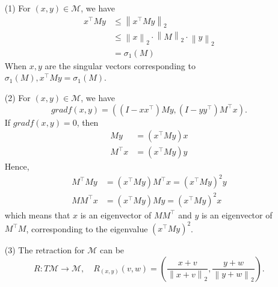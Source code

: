 \documentclass[en, oneside]{assignment}
\begin{document}
\begin{sol}
    \begin{itemize}
        \item[(1)] For $(x, y) \in \mathcal{M}$, we have
        \begin{align*}
            x ^\top M y & \leq \left\lVert x ^\top M y \right\rVert _2\\
            & \leq \left\lVert x \right\rVert _2 \cdot \left\lVert M \right\rVert _2 \cdot \left\lVert y \right\rVert _2\\
            & = \sigma _1 (M)
        \end{align*}
        When $x, y$ are the singular vectors corresponding to $\sigma _1 (M), x ^\top M y = \sigma _1 (M)$.
        \item[(2)] For $(x, y) \in \mathcal{M}$, we have
        \begin{equation*}
            gradf(x, y) = ((I - xx^{\top})M y, (I - yy^{\top})M^{\top} x).
        \end{equation*}
        If $gradf(x, y) = 0$, then
        \begin{align*}
            M y & = (x ^\top M y) x\\
            M ^\top x & = (x ^\top M y) y
        \end{align*}
        Hence, 
        \begin{align*}
            M ^\top M y & = (x ^\top M y) M^\top x = (x ^\top M y) ^2 y\\
            M M ^\top x & = (x ^\top M y) M y = (x ^\top M y) ^2 x
        \end{align*}
        which means that $x$ is an eigenvector of $M M^\top$ and $y$ is an eigenvector of $M ^\top M$, corresponding to the eigenvalue $(x ^\top M y) ^2$.
        \item[(3)] The retraction for $\mathcal{M}$ can be
        \begin{equation*}
            R: T \mathcal{M} \to \mathcal{M}, \quad R _{(x, y)} (v, w) = 
            (\frac{x+v}{\left\lVert x+v \right\rVert _2}, \frac{y+w}{\left\lVert y+w \right\rVert _2}).
        \end{equation*}
    \end{itemize}
\end{sol}
\end{document}
